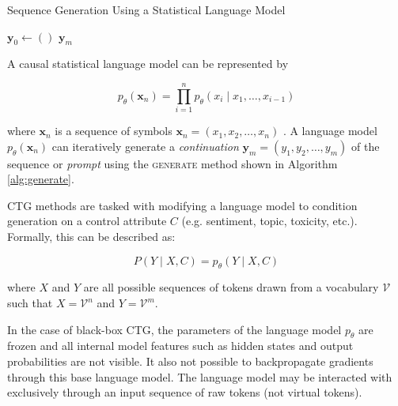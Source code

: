 \documentclass[phd,electronic,oneside,twosidetoc,letterpaper,chaptercenter,parttop,lof]{byumsphd}
\begin{document}
\begin{algorithm}[t]
\caption{Sequence Generation Using a Statistical Language Model}
\label{alg:generate}
\SetAlgoLined
\DontPrintSemicolon
{}

$\mathbf{y}_0 \leftarrow ()$ 
\Return $\mathbf{y}_m$\;
\end{algorithm}

 A causal statistical language model can be represented by 

\begin{equation}
p_{\theta}(\mathbf{x}_n) = \prod_{i=1}^{n} p_{\theta}(x_i \mid x_1, \ldots, x_{i - 1})
\end{equation}

where \(\mathbf{x}_n\) is a sequence of symbols \(\mathbf{x}_n = (x_1, x_2, \ldots, x_n)\) \cite{bengio2000neural}.
A language model \(p_\theta(\mathbf{x}_n)\) can iteratively generate a \emph{continuation} \(\mathbf{y}_m = (y_1, y_2, \ldots, y_m)\) of the sequence or \emph{prompt} using the \textsc{generate} method shown in Algorithm \ref{alg:generate}.

CTG methods are tasked with modifying a language model to condition generation on a control attribute \(C\) (e.g. sentiment, topic, toxicity, etc.). Formally, this can be described as:

\begin{equation}
    P(Y \mid X, C) = p_\theta(Y \mid X, C)
\end{equation}

where \(X\) and \(Y\) are all possible sequences of tokens drawn from a vocabulary \(\mathcal{V}\) such that \(X = \mathcal{V}^{n}\) and \(Y = \mathcal{V}^m\).

In the case of black-box CTG, the parameters of the language model \(p_\theta\) are frozen and all internal model features such as hidden states and output probabilities are not visible. It also not possible to backpropagate gradients through this base language model. The language model may be interacted with exclusively through an input sequence of raw tokens (not virtual tokens).
\end{document}
